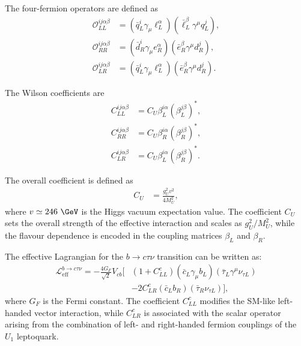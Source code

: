 The four-fermion operators are defined as
\begin{align}
\mathcal{O}_{LL}^{ij\alpha\beta}
&=
\left(
\bar{q}_{L}^{i}\gamma_{\mu}\ell_{L}^{\alpha}
\right)
\left(
\bar{\ell}_{L}^{\beta}\gamma^{\mu}q_{L}^{j}
\right),
\\
\mathcal{O}_{RR}^{ij\alpha\beta}
&=
\left(
\bar{d}_{R}^{i}\gamma_{\mu}e_{R}^{\alpha}
\right)
\left(
\bar{e}_{R}^{\beta}\gamma^{\mu}d_{R}^{j}
\right),
\\
\mathcal{O}_{LR}^{ij\alpha\beta}
&=
\left(
\bar{q}_{L}^{i}\gamma_{\mu}\ell_{L}^{\alpha}
\right)
\left(
\bar{e}_{R}^{\beta}\gamma^{\mu}d_{R}^{j}
\right).
\end{align}

The Wilson coefficients are
\begin{align}
C_{LL}^{ij\alpha\beta}
&=
C_{U}\beta_{L}^{i\alpha}
\left(
\beta_{L}^{j\beta}
\right)^{*},
\\
C_{RR}^{ij\alpha\beta}
&=
C_{U}\beta_{R}^{i\alpha}
\left(
\beta_{R}^{j\beta}
\right)^{*},
\\
C_{LR}^{ij\alpha\beta}
&=
C_{U}\beta_{L}^{i\alpha}
\left(
\beta_{R}^{j\beta}
\right)^{*}.
\end{align}

The overall coefficient is defined as
\begin{align}
C_{U}
&=
\frac{g_{U}^{2}v^{2}}{4M_{U}^{2}},
\label{eq:cu_definition}
\end{align}
where $v\simeq246~\GeV$ is the Higgs vacuum expectation value.
The coefficient $C_{U}$ sets the overall strength of the effective interaction and scales as $g_{U}^{2}/M_{U}^{2}$, while the flavour dependence is encoded in the coupling matrices $\beta_{L}$ and $\beta_{R}$.

The effective Lagrangian for the $b\to c\tau\nu$ transition can be written as:
\begin{align}
    \mathcal{L}_{\mathrm{eff}}^{b\rightarrow c\tau\nu}
    =
    -\frac{4G_{F}}{\sqrt{2}}V_{cb}
    \bigg[
        &
        \left(
            1+C_{LL}^{c}
        \right)
        \left(
            \bar{c}_{L}\gamma_{\mu}b_{L}
        \right)
        \left(
            \bar{\tau}_{L}\gamma^{\mu}\nu_{\tau L}
        \right)
        \nonumber\\
        &
        -
        2C_{LR}^{c}
        \left(
            \bar{c}_{L}b_{R}
        \right)
        \left(
            \bar{\tau}_{R}\nu_{\tau L}
        \right)
    \bigg],
    \label{eq:bctaunu_effective_lagrangian}
\end{align}
where $G_{F}$ is the Fermi constant.
The coefficient $C_{LL}^{c}$ modifies the SM-like left-handed vector
interaction, while $C_{LR}^{c}$ is associated with the scalar operator
arising from the combination of left- and right-handed fermion couplings
of the $U_{1}$ leptoquark.

